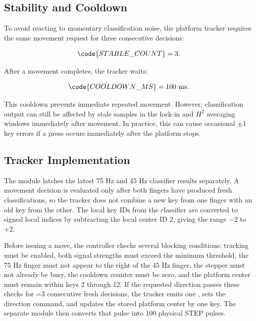 \subsection{Stability and Cooldown}

To avoid reacting to momentary classification noise, the platform tracker requires the same movement request for three consecutive decisions:

\begin{equation}
    \code{STABLE\_COUNT} = 3.
\end{equation}

After a movement completes, the tracker waits:

\begin{equation}
    \code{COOLDOWN\_MS} = 100~\mathrm{ms}.
\end{equation}

This cooldown prevents immediate repeated movement. However, classification output can still be affected by stale samples in the lock-in and $H^2$ averaging windows immediately after movement. In practice, this can cause occasional $\pm 1$ key errors if a press occurs immediately after the platform stops.

\subsection{Tracker Implementation}

The module  latches the latest 75 Hz and 45 Hz classifier results separately. A movement decision is evaluated only after both fingers have produced fresh classifications, so the tracker does not combine a new key from one finger with an old key from the other. The local key IDs from the classifier are converted to signed local indices by subtracting the local center ID 2, giving the range $-2$ to $+2$.

Before issuing a move, the controller checks several blocking conditions: tracking must be enabled, both signal strengths must exceed the minimum threshold, the 75 Hz finger must not appear to the right of the 45 Hz finger, the stepper must not already be busy, the cooldown counter must be zero, and the platform center must remain within keys 2 through 12. If the requested direction passes these checks for =3 consecutive fresh decisions, the tracker emits one , sets the direction command, and updates the stored platform center by one key. The separate  module then converts that pulse into 100 physical STEP pulses.

